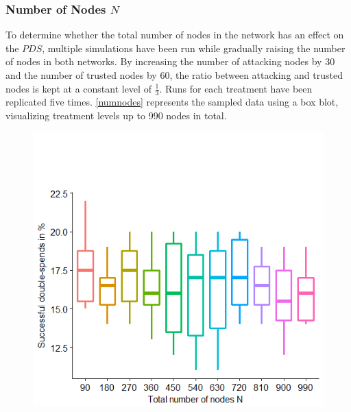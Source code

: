 \documentclass[a4paper,12pt,twoside]{report}
\begin{document}
\subsubsection{Number of Nodes $N$}
To determine whether the total number of nodes in the network has an effect on the $PDS$, multiple simulations have been run while gradually raising the number of nodes in both networks. By increasing the number of attacking nodes by 30 and the number of trusted nodes by 60, the ratio between attacking and trusted nodes is kept at a constant level of $\frac{1}{3}$. Runs for each treatment have been replicated five times. \autoref{numnodes} represents the sampled data using a box blot, visualizing treatment levels up to 990 nodes in total.
\begin{figure}
\centering
\begin{minipage}{.5\textwidth}
  \centering
  \includegraphics[width=\linewidth]{Experiments/numnodes.png}
  \label{numnodes}
\end{minipage}%
\begin{minipage}{.5\textwidth}
  \centering

\end{minipage}
\end{figure}
\end{document}
